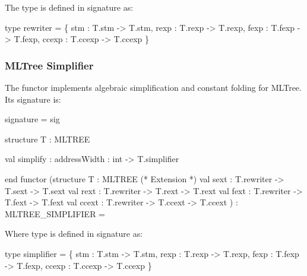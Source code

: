 The type  is defined in signature
 as:
\begin{SML}
   type rewriter = 
       \{ stm   : T.stm -> T.stm,
         rexp  : T.rexp -> T.rexp,
         fexp  : T.fexp -> T.fexp,
         ccexp : T.ccexp -> T.ccexp
       \} 
\end{SML}
 
\subsubsection{MLTree Simplifier}

The functor 
implements algebraic simplification and constant folding for MLTree.
Its signature is:
\begin{SML}
signature  =
sig

   structure T : MLTREE

   val simplify  :
       { addressWidth : int } -> T.simplifier
   
end
functor 
  (structure T : MLTREE
   (* Extension *)
   val sext : T.rewriter -> T.sext -> T.sext
   val rext : T.rewriter -> T.rext -> T.rext
   val fext : T.rewriter -> T.fext -> T.fext
   val ccext : T.rewriter -> T.ccext -> T.ccext
  ) : MLTREE_SIMPLIFIER =
\end{SML}

Where type  is defined in signature 
 as:
\begin{SML}
   type simplifier =
       \{ stm   : T.stm -> T.stm,
         rexp  : T.rexp -> T.rexp,
         fexp  : T.fexp -> T.fexp,
         ccexp : T.ccexp -> T.ccexp
       \}
\end{SML}


